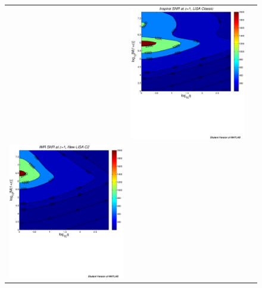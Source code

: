 \documentclass{iopart}
\begin{document}
\begin{figure}[htb]
\begin{center}
\begin{tabular}{ccc}
&\includegraphics[scale=0.33,clip=true]{FigEmanuele/InspSNRContourz1.ps}\\
\includegraphics[scale=0.33,clip=true]{FigEmanuele/C2IMRSNRContourz1.ps}

\end{tabular}
\end{center}
\end{figure}
\end{document}
